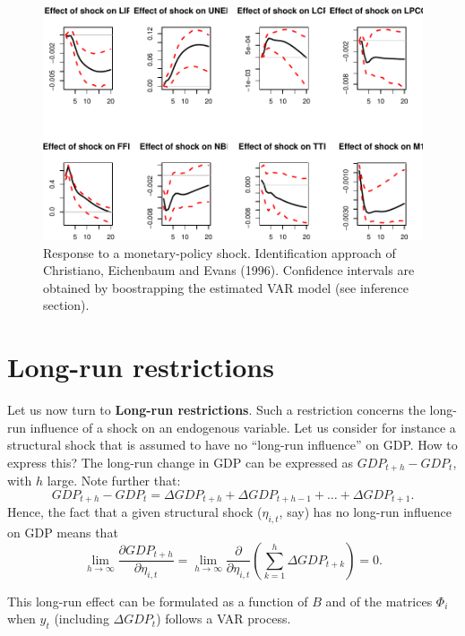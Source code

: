 \documentclass[
  12pt,
]{book}
\theoremstyle{definition}
\theoremstyle{definition}
\theoremstyle{definition}
\theoremstyle{definition}
\theoremstyle{remark}
\begin{document}
\begin{figure}
\includegraphics[width=0.95\linewidth]{IdentifStructShocks_files/figure-latex/CEE-1} \caption{Response to a monetary-policy shock. Identification approach of Christiano, Eichenbaum and Evans (1996). Confidence intervals are obtained by boostrapping the estimated VAR model (see inference section).}\label{fig:CEE}
\end{figure}

\hypertarget{long-run-restrictions}{%
\section{Long-run restrictions}\label{long-run-restrictions}}

Let us now turn to \textbf{Long-run restrictions}. Such a restriction concerns the long-run influence of a shock on an endogenous variable. Let us consider for instance a structural shock that is assumed to have no ``long-run influence'' on GDP. How to express this? The long-run change in GDP can be expressed as \(GDP_{t+h} - GDP_t\), with \(h\) large. Note further that:
\[
GDP_{t+h} - GDP_t = \Delta GDP_{t+h} +\Delta GDP_{t+h-1} + \dots + \Delta GDP_{t+1}.
\]
Hence, the fact that a given structural shock (\(\eta_{i,t}\), say) has no long-run influence on GDP means that
\[
\lim_{h\rightarrow\infty}\frac{\partial GDP_{t+h}}{\partial \eta_{i,t}} = \lim_{h\rightarrow\infty} \frac{\partial}{\partial \eta_{i,t}}\left(\sum_{k=1}^h \Delta  GDP_{t+k}\right)= 0.
\]

This long-run effect can be formulated as a function of \(B\) and of the matrices \(\Phi_i\) when \(y_t\) (including \(\Delta GDP_t\)) follows a VAR process.
\end{document}

